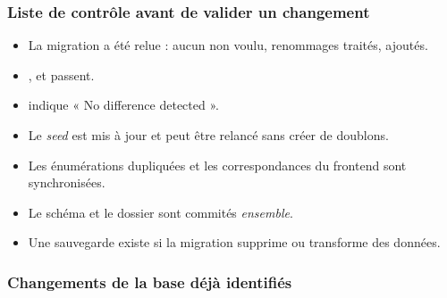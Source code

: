 \subsubsection{Liste de contrôle avant de valider un changement}
\begin{itemize}[label=$\square$]
  \item La migration a été relue : aucun  non voulu, renommages traités,  ajoutés.
  \item {},  et  passent.
  \item {} indique « No difference detected ».
  \item Le \emph{seed} est mis à jour et peut être relancé sans créer de doublons.
  \item Les énumérations dupliquées et les correspondances du frontend sont synchronisées.
  \item Le schéma et le dossier  sont commités \emph{ensemble}.
  \item Une sauvegarde existe si la migration supprime ou transforme des données.
\end{itemize}

\subsubsection{Changements de la base déjà identifiés}

